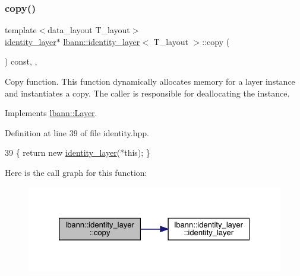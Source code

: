 \subsubsection{\texorpdfstring{copy()}{copy()}}
{\footnotesize\ttfamily template$<$data\+\_\+layout T\+\_\+layout$>$ \\
\hyperlink{classlbann_1_1identity__layer}{identity\+\_\+layer}$\ast$ \hyperlink{classlbann_1_1identity__layer}{lbann\+::identity\+\_\+layer}$<$ T\+\_\+layout $>$\+::copy (\begin{DoxyParamCaption}{ }\end{DoxyParamCaption}) const\hspace{0.3cm}{\ttfamily [inline]}, {\ttfamily [override]}, {\ttfamily [virtual]}}

Copy function. This function dynamically allocates memory for a layer instance and instantiates a copy. The caller is responsible for deallocating the instance. 

Implements \hyperlink{classlbann_1_1Layer_af420f22bbac801c85483ade84588a23f}{lbann\+::\+Layer}.



Definition at line 39 of file identity.\+hpp.


\begin{DoxyCode}
39 \{ \textcolor{keywordflow}{return} \textcolor{keyword}{new} \hyperlink{classlbann_1_1identity__layer_ad6392bffa4f10325e129b64e3bcc4599}{identity\_layer}(*\textcolor{keyword}{this}); \}
\end{DoxyCode}
Here is the call graph for this function\+:\nopagebreak
\begin{figure}[H]
\begin{center}
\leavevmode
\includegraphics[width=326pt]{classlbann_1_1identity__layer_ac9407c3e6f576eb2c3b873f37daed159_cgraph}
\end{center}
\end{figure}
\mbox{\label{classlbann_1_1identity__layer_aaa19914b20bc409aa3fb8a744e994114}} 
